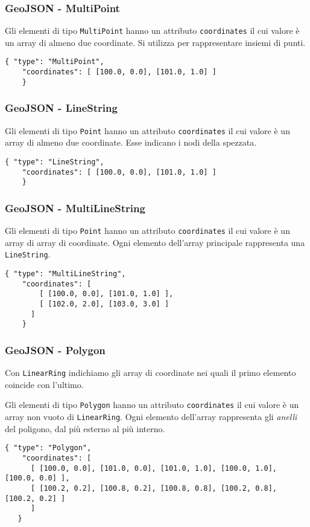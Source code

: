 \documentclass[8pt]{beamer}
\begin{document}
\begin{frame}[fragile]
 \frametitle{GeoJSON - MultiPoint}
 Gli elementi di tipo \texttt{MultiPoint} hanno un attributo \texttt{coordinates} 
 il cui valore \`e un array di almeno due coordinate. Si utilizza per rappresentare
 insiemi di punti.
  
\begin{verbatim}
{ "type": "MultiPoint",
    "coordinates": [ [100.0, 0.0], [101.0, 1.0] ]
    }
\end{verbatim}
\end{frame}

\begin{frame}[fragile]
 \frametitle{GeoJSON - LineString}
 Gli elementi di tipo \texttt{Point} hanno un attributo \texttt{coordinates} 
 il cui valore \`e un array di almeno due coordinate. Esse indicano i nodi
 della spezzata.
  
\begin{verbatim}
{ "type": "LineString",
    "coordinates": [ [100.0, 0.0], [101.0, 1.0] ]
    }
\end{verbatim}
\end{frame}

\begin{frame}[fragile]
 \frametitle{GeoJSON - MultiLineString}
 Gli elementi di tipo \texttt{Point} hanno un attributo \texttt{coordinates} 
 il cui valore \`e un array di array di coordinate. Ogni elemento dell'array
 principale rappresenta una \texttt{LineString}.
  
\begin{verbatim}
{ "type": "MultiLineString",
    "coordinates": [
        [ [100.0, 0.0], [101.0, 1.0] ],
        [ [102.0, 2.0], [103.0, 3.0] ]
      ]
    }
\end{verbatim}
\end{frame}

\begin{frame}[fragile]
 \frametitle{GeoJSON - Polygon}
 Con \texttt{LinearRing} indichiamo gli array di coordinate nei quali
 il primo elemento coincide con l'ultimo.
 \vspace{\baselineskip}
 
 Gli elementi di tipo \texttt{Polygon} hanno un attributo \texttt{coordinates} 
 il cui valore \`e un array non vuoto di \texttt{LinearRing}. Ogni elemento dell'array
 rappresenta gli \emph{anelli} del poligono, dal pi\`u esterno al pi\`u interno.
 
\begin{verbatim}
{ "type": "Polygon",
    "coordinates": [
      [ [100.0, 0.0], [101.0, 0.0], [101.0, 1.0], [100.0, 1.0], [100.0, 0.0] ],
      [ [100.2, 0.2], [100.8, 0.2], [100.8, 0.8], [100.2, 0.8], [100.2, 0.2] ]
      ]
   }
\end{verbatim}
\end{frame}
\end{document}
